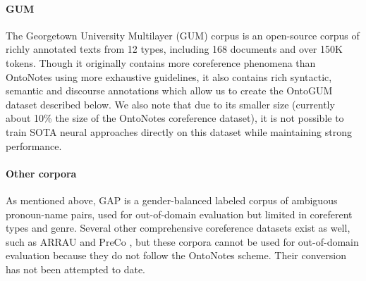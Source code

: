 \documentclass[11pt,a4paper]{article}
\begin{document}
\paragraph{GUM} The Georgetown University Multilayer (GUM) corpus \citep{Zeldes2017} is an open-source corpus of richly annotated texts from 12 types, including 168 documents and over 150K tokens. Though it originally contains more coreference phenomena than OntoNotes using more exhaustive guidelines, it also contains rich syntactic, semantic and discourse annotations which allow us to create the OntoGUM dataset described below. We also note that due to its smaller size (currently about 10\% the size of the OntoNotes coreference dataset), it is not possible to train SOTA neural approaches directly on this dataset while maintaining strong performance.

\paragraph{Other corpora} As mentioned above, GAP is a gender-balanced labeled corpus of ambiguous pronoun-name pairs, used for out-of-domain evaluation but limited in coreferent types and genre. Several other comprehensive coreference datasets exist as well, such as ARRAU \cite{poesio-etal-2018-anaphora} and PreCo \cite{chen-etal-2018-preco}, but these corpora cannot be used for out-of-domain evaluation because they do not follow the OntoNotes scheme. Their conversion has not been attempted to date.
\end{document}
